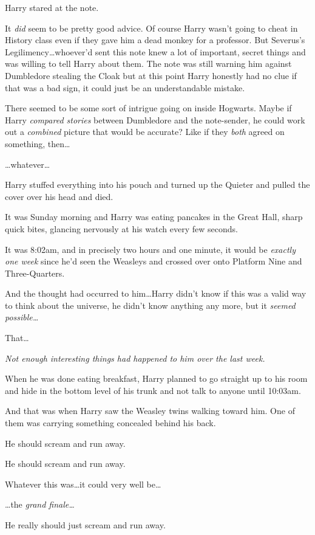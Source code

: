 Harry stared at the note.

It \emph{did} seem to be pretty good advice. Of course Harry wasn’t going to cheat in History class even if they gave him a dead monkey for a professor. But Severus’s Legilimency…whoever’d sent this note knew a lot of important, secret things and was willing to tell Harry about them. The note was still warning him against Dumbledore stealing the Cloak but at this point Harry honestly had no clue if that was a bad sign, it could just be an understandable mistake.

There seemed to be some sort of intrigue going on inside Hogwarts. Maybe if Harry \emph{compared stories} between Dumbledore and the note-sender, he could work out a \emph{combined} picture that would be accurate? Like if they \emph{both} agreed on something, then…

…whatever…

Harry stuffed everything into his pouch and turned up the Quieter and pulled the cover over his head and died.

\later

It was Sunday morning and Harry was eating pancakes in the Great Hall, sharp quick bites, glancing nervously at his watch every few seconds.

It was 8:02am, and in precisely two hours and one minute, it would be \emph{exactly one week} since he’d seen the Weasleys and crossed over onto Platform Nine and Three-Quarters.

And the thought had occurred to him…Harry didn’t know if this was a valid way to think about the universe, he didn’t know anything any more, but it \emph{seemed possible…}

That…

\emph{Not enough interesting things had happened to him over the last week.}

When he was done eating breakfast, Harry planned to go straight up to his room and hide in the bottom level of his trunk and not talk to anyone until 10:03am.

And that was when Harry saw the Weasley twins walking toward him. One of them was carrying something concealed behind his back.

He should scream and run away.

He should scream and run away.

Whatever this was…it could very well be…

…the \emph{grand finale…}

He really should just scream and run away.

